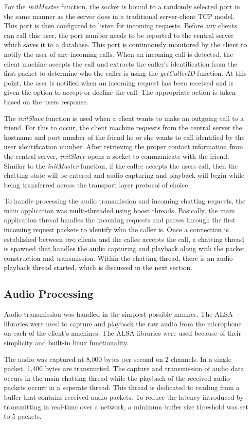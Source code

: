 For the \textit{initMaster} function, the socket is bound to a randomly selected 
port in the same manner as the server does in a traditional server-client TCP model.
This port is then configured to listen for incoming requests. 
Before any clients can call this user, the port number needs to be reported to
the central server which saves it to a database. This port is continuously 
monitored by the client to notify the user of any incoming calls.  When an incoming
call is detected, the client machine accepts the call and extracts the caller's 
identification from the first packet to determine who the caller is using the 
\textit{getCallerID} function.  At this point, the user is notified when an 
incoming request has been received and is given the option to accept or decline
the call.  The appropriate action is taken based on the users response.

The \textit{initSlave} function is used when a client wants to make an outgoing
call to a friend.  For this to occur, the client machine requests from the central 
server the hostname and port number of the friend he or she wants to call 
identified by the user identification number.  After retrieving the proper contact 
information from the central server, \textit{initSlave} opens a socket to 
communicate with the friend.  Similar to the \textit{initMaster} function, if the
callee accepts the users call, then the chatting state will be entered and audio
capturing and playback will begin while being transferred across the transport
layer protocol of choice.

To handle processing the audio transmission and incoming chatting requests, the
main application was multi-threaded using boost threads.  Basically, the main
application thread handles the incoming requests and parses through the first
incoming request packets to identify who the caller is.  Once a connection
is established between two clients and the callee accepts the call, a chatting
thread is spawned that handles the audio capturing and playback along with the 
packet construction and transmission.  Within the chatting thread, there is an
audio playback thread started, which is discussed in the next section.


\subsection{Audio Processing}
\label{subsec:audio_proc}

Audio transmission was handled in the simplest possible manner.  The ALSA libraries
were used to capture and playback the raw audio from the microphone on each of the 
client's machines.  The ALSA libraries were used because of their simplicity and
built-in linux functionality.   

The audio was captured at 8,000 bytes per second on 2 channels.  In a 
single packet, 1,400 bytes are transmitted.  The capture and transmission of audio 
data occurs in the main chatting thread while the playback of the received audio 
packets occurr in a seperate thread.  This thread is dedicated to reading from
a buffer that contains received audio packets.  To reduce the latency 
introduced by transmitting in real-time over a network, a minimum buffer size
threshold was set to 5 packets.

